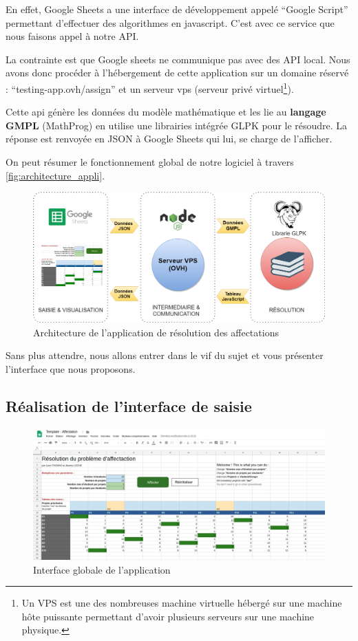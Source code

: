 \documentclass[final,poster]{polytech/polytech}
\begin{document}
En effet, Google Sheets a une interface de développement appelé “Google Script” permettant d’effectuer des algorithmes en javascript.
C'est avec ce service que nous faisons appel à notre API.

La contrainte est que Google sheets ne communique pas avec des API local. Nous avons donc procéder à l'hébergement de cette application sur un domaine réservé : “testing-app.ovh/assign” et un serveur vps (serveur privé virtuel\footnote{Un VPS est une des nombreuses machine virtuelle hébergé sur une machine hôte puissante permettant d'avoir plusieurs serveurs sur une machine physique.}).

Cette api génère les données du modèle mathématique et les lie au \textbf{langage GMPL} (MathProg) en utilise une librairies intégrée GLPK pour le résoudre. 
La réponse est renvoyée en JSON à Google Sheets qui lui, se charge de l’afficher.

On peut résumer le fonctionnement global de notre logiciel à travers \autoref{fig:architecture_appli}.

\begin{figure}[htbp]
\includegraphics[width=15cm]{images/architecture_appli}
\caption{\label{fig:architecture_appli} Architecture de l'application de résolution des affectations}
\end{figure}

Sans plus attendre, nous allons entrer dans le vif du sujet et vous présenter l'interface que nous proposons.

\subsection{Réalisation de l'interface de saisie}

\begin{figure}
\includegraphics[width=15cm]{images/interface_appli_globale}
\caption{\label{fig:appli_interface_globale} Interface globale de l'application}
\end{figure}
\end{document}
